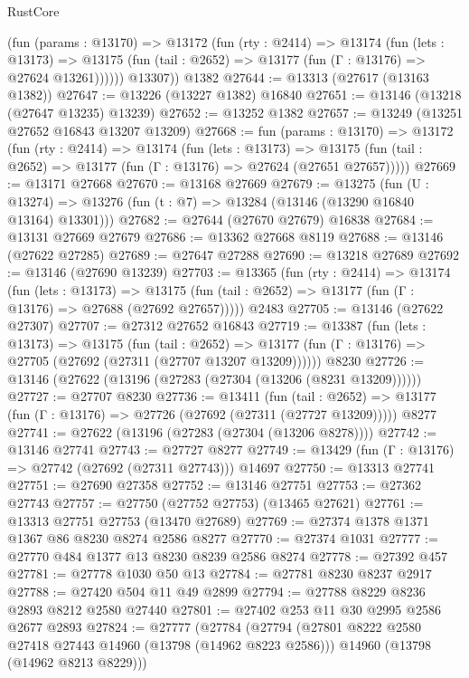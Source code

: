 \begin{lexlean}{RustCore}
\begin{coremodule}
          (fun (params : @13170) =>
          @13172
            (fun (rty : @2414) =>
            @13174
              (fun (lets : @13173) =>
              @13175 (fun (tail : @2652) => @13177 (fun (Γ : @13176) => @27624 @13261))))))
        @13307))
    @1382
@27644 := @13313 (@27617 (@13163 @1382))
@27647 := @13226 (@13227 @1382) @16840
@27651 := @13146 (@13218 (@27647 @13235) @13239)
@27652 := @13252 @1382
@27657 := @13249 (@13251 @27652 @16843 @13207 @13209)
@27668 := fun (params : @13170) =>
  @13172
    (fun (rty : @2414) =>
    @13174
      (fun (lets : @13173) =>
      @13175 (fun (tail : @2652) => @13177 (fun (Γ : @13176) => @27624 (@27651 @27657)))))
@27669 := @13171 @27668
@27670 := @13168 @27669
@27679 := @13275
    (fun (U : @13274) => @13276 (fun (t : @7) => @13284 (@13146 (@13290 @16840 @13164) @13301)))
@27682 := @27644 (@27670 @27679) @16838
@27684 := @13131 @27669 @27679
@27686 := @13362 @27668 @8119
@27688 := @13146 (@27622 @27285)
@27689 := @27647 @27288
@27690 := @13218 @27689
@27692 := @13146 (@27690 @13239)
@27703 := @13365
    (fun (rty : @2414) =>
    @13174
      (fun (lets : @13173) =>
      @13175 (fun (tail : @2652) => @13177 (fun (Γ : @13176) => @27688 (@27692 @27657)))))
    @2483
@27705 := @13146 (@27622 @27307)
@27707 := @27312 @27652 @16843
@27719 := @13387
    (fun (lets : @13173) =>
    @13175
      (fun (tail : @2652) =>
      @13177 (fun (Γ : @13176) => @27705 (@27692 (@27311 (@27707 @13207 @13209))))))
    @8230
@27726 := @13146 (@27622 (@13196 (@27283 (@27304 (@13206 (@8231 @13209))))))
@27727 := @27707 @8230
@27736 := @13411
    (fun (tail : @2652) => @13177 (fun (Γ : @13176) => @27726 (@27692 (@27311 (@27727 @13209)))))
    @8277
@27741 := @27622 (@13196 (@27283 (@27304 (@13206 @8278))))
@27742 := @13146 @27741
@27743 := @27727 @8277
@27749 := @13429 (fun (Γ : @13176) => @27742 (@27692 (@27311 @27743))) @14697
@27750 := @13313 @27741
@27751 := @27690 @27358
@27752 := @13146 @27751
@27753 := @27362 @27743
@27757 := @27750 (@27752 @27753) (@13465 @27621)
@27761 := @13313 @27751 @27753 (@13470 @27689)
@27769 := @27374 @1378 @1371 @1367 @86 @8230 @8274 @2586 @8277
@27770 := @27374 @1031
@27777 := @27770 @484 @1377 @13 @8230 @8239 @2586 @8274
@27778 := @27392 @457
@27781 := @27778 @1030 @50 @13
@27784 := @27781 @8230 @8237 @2917
@27788 := @27420 @504 @11 @49 @2899
@27794 := @27788 @8229 @8236 @2893 @8212 @2580 @27440
@27801 := @27402 @253 @11 @30 @2995 @2586 @2677 @2893
@27824 := @27777
    (@27784
      (@27794
        (@27801 @8222 @2580 @27418 @27443 @14960 (@13798 (@14962 @8223 @2586)))
        @14960
        (@13798 (@14962 @8213 @8229)))

\end{coremodule}
\end{lexlean}
